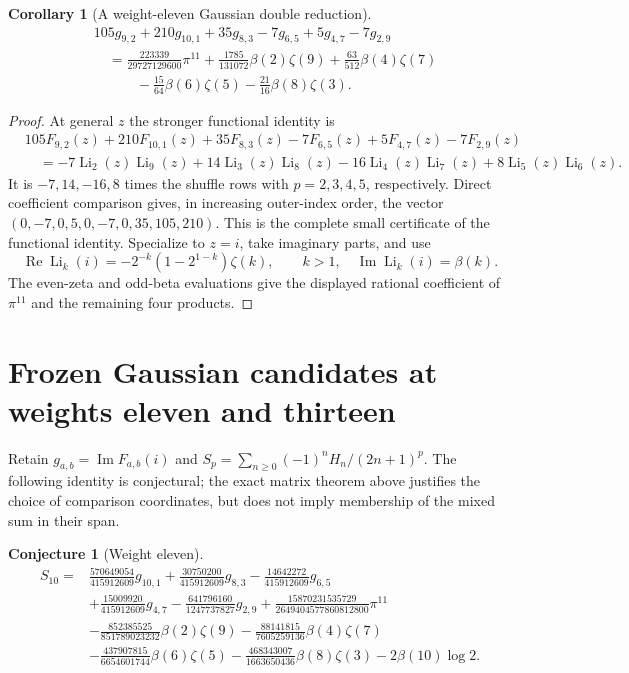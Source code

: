 \documentclass[11pt,letterpaper]{article}
\newtheorem{corollary}[theorem]{Corollary}
\newtheorem{conjecture}[theorem]{Conjecture}
\theoremstyle{definition}
\theoremstyle{remark}
\begin{document}
\begin{corollary}[A weight-eleven Gaussian double reduction]
\begin{align*}
 &105g_{9,2}+210g_{10,1}+35g_{8,3}-7g_{6,5}+5g_{4,7}-7g_{2,9}\\
 &\quad=\frac{223339}{29727129600}\pi^{11}
 +\frac{1785}{131072}\beta(2)\zeta(9)
 +\frac{63}{512}\beta(4)\zeta(7)\\
 &\qquad\quad-\frac{15}{64}\beta(6)\zeta(5)
 -\frac{21}{16}\beta(8)\zeta(3).
\end{align*}
\end{corollary}
\begin{proof}
At general $z$ the stronger functional identity is
\begin{align*}
 &105F_{9,2}(z)+210F_{10,1}(z)+35F_{8,3}(z)
       -7F_{6,5}(z)+5F_{4,7}(z)-7F_{2,9}(z)\\
 &\quad=-7\operatorname{Li}_2(z)\operatorname{Li}_9(z)
       +14\operatorname{Li}_3(z)\operatorname{Li}_8(z)
       -16\operatorname{Li}_4(z)\operatorname{Li}_7(z)
       +8\operatorname{Li}_5(z)\operatorname{Li}_6(z).
\end{align*}
It is $-7,14,-16,8$ times the shuffle rows with $p=2,3,4,5$,
respectively.  Direct coefficient comparison gives, in increasing
outer-index order, the vector
$(0,-7,0,5,0,-7,0,35,105,210)$.  This is the complete small
certificate of the functional identity.  Specialize to $z=i$, take
imaginary parts, and use
\[
 \operatorname{Re}\operatorname{Li}_k(i)
 =-2^{-k}(1-2^{1-k})\zeta(k),\qquad k>1,
 \quad
 \operatorname{Im}\operatorname{Li}_k(i)=\beta(k).
\]
The even-zeta and odd-beta evaluations give the displayed rational
coefficient of $\pi^{11}$ and the remaining four products.
\end{proof}

\section{Frozen Gaussian candidates at weights eleven and thirteen}
\label{sec:candidates}

Retain $g_{a,b}=\operatorname{Im}F_{a,b}(i)$ and
$S_p=\sum_{n\geq0}(-1)^nH_n/(2n+1)^p$.
The following identity is conjectural; the exact matrix theorem above
justifies the choice of comparison coordinates, but does not imply
membership of the mixed sum in their span.

\begin{conjecture}[Weight eleven]\label{conj:S10}
\begin{align*}
 S_{10}={}&\frac{570649054}{415912609}g_{10,1}
 +\frac{30750200}{415912609}g_{8,3}
 -\frac{14642272}{415912609}g_{6,5}\\
 &+\frac{15009920}{415912609}g_{4,7}
 -\frac{641796160}{1247737827}g_{2,9}
 +\frac{15870231535729}{2649404577860812800}\pi^{11}\\
 &-\frac{852385525}{851789023232}\beta(2)\zeta(9)
 -\frac{88141815}{7605259136}\beta(4)\zeta(7)\\
 &-\frac{437907815}{6654601744}\beta(6)\zeta(5)
 -\frac{468343007}{1663650436}\beta(8)\zeta(3)
 -2\beta(10)\log2.
\end{align*}
\end{conjecture}
\end{document}
